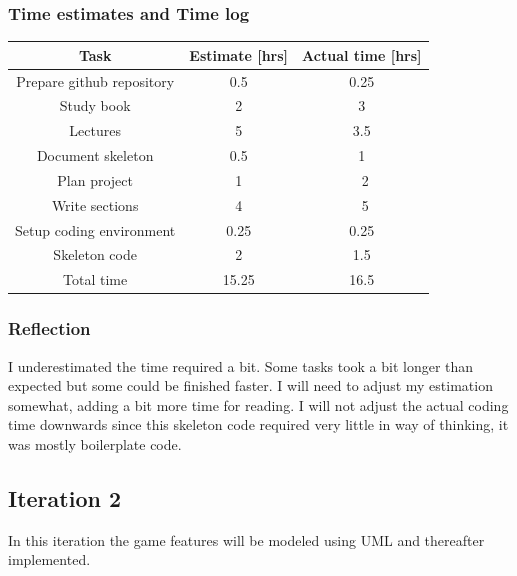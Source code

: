 \documentclass[12pt, letterpaper]{article}
\begin{document}
\subsubsection{Time estimates and Time log}
\begin{center}
	\begin{tabular}{|c|c|c|} 
		\hline
		Task & Estimate [hrs] & Actual time [hrs] \\ [0.5ex] 
		\hline\hline
		Prepare github repository & 0.5 & 0.25\\
		\hline 
		Study book & 2 & 3 \\
		\hline
		Lectures & 5 & 3.5 \\
		\hline 
		Document skeleton & 0.5 & 1 \\
		\hline 
		Plan project & 1 & ~2\\
		\hline
		Write sections & 4 & ~5\\
		\hline 
		Setup coding environment & 0.25 & 0.25\\
		\hline 
		Skeleton code & 2 & 1.5 \\ 
		\hline
		Total time & 15.25 & 16.5\\ [1ex]
		\hline 
	\end{tabular}
\end{center}
\subsubsection{Reflection}
I underestimated the time required a bit. Some tasks took a bit longer than expected but some could be finished faster. I will need to adjust my estimation somewhat, adding a bit more time for reading. I will not adjust the actual coding time downwards since this skeleton code required very little in way of thinking, it was mostly boilerplate code.

\subsection{Iteration 2}
In this iteration the game features will be modeled using UML and thereafter implemented.
\end{document}
